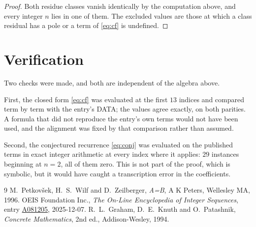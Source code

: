 \documentclass[11pt,a4paper]{article}
\theoremstyle{plain}
\theoremstyle{definition}
\begin{document}
\begin{proof}
Both residue classes vanish identically by the computation above, and every integer $n$
lies in one of them. The excluded values are those at which a class residual has a pole or
a term of \eqref{eq:cf} is undefined.
\end{proof}

\section{Verification}

Two checks were made, and both are independent of the algebra above.

First, the closed form \eqref{eq:cf} was evaluated at the first $13$ indices and
compared term by term with the entry's DATA; the values agree exactly, on both parities. A
formula that did not reproduce the entry's own terms would not have been used, and the
alignment was fixed by that comparison rather than assumed.

Second, the conjectured recurrence \eqref{eq:conj} was evaluated on the published terms in
exact integer arithmetic at every index where it applies: $29$ instances beginning at
$n=2$, all of them zero. This is not part of the proof, which is symbolic, but it
would have caught a transcription error in the coefficients.

\begin{thebibliography}{9}
 M.~Petkov\v{s}ek, H.~S.~Wilf and D.~Zeilberger, \emph{A=B}, A K Peters,
Wellesley MA, 1996.
 OEIS Foundation Inc., \emph{The On-Line Encyclopedia of Integer Sequences},
entry \href{https://oeis.org/A081205}{A081205}, 2025-12-07.
 R.~L.~Graham, D.~E.~Knuth and O.~Patashnik, \emph{Concrete Mathematics},
2nd ed., Addison-Wesley, 1994.
\end{thebibliography}
\end{document}
